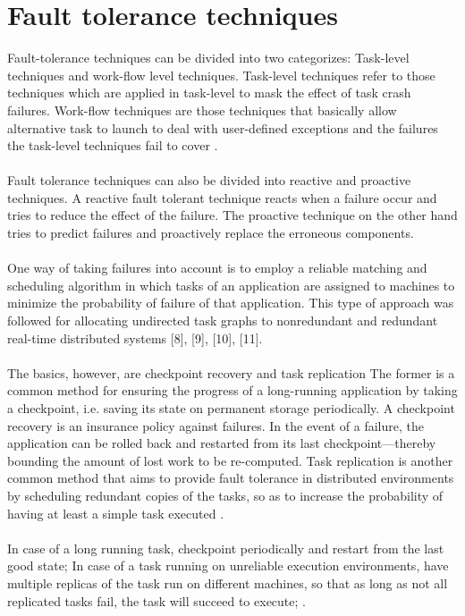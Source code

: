 \documentclass{cslthse-msc}
\begin{document}
\section{Fault tolerance techniques}
Fault-tolerance techniques can be divided into two categorizes:
Task-level techniques and work-flow level techniques.
Task-level techniques refer to those techniques which are applied in task-level to mask the effect of task crash failures. Work-flow techniques are those techniques that basically allow alternative task to launch to deal with user-defined exceptions and the failures the task-level techniques fail to cover \cite{gridWorkflow}.
\\\\
Fault tolerance techniques can also be divided into reactive and proactive techniques. A reactive fault tolerant technique reacts when a failure occur and tries to reduce the effect of the failure. The proactive technique on the other hand tries to predict failures and proactively replace the erroneous components.
\\\\
One way of taking failures into account is to employ a reliable matching and scheduling algorithm in which tasks of an application are assigned to machines to minimize the probability of failure of that application. This type of approach was followed for allocating undirected task graphs to nonredundant and redundant real-time distributed systems [8], [9], [10], [11].
\\\\
The basics, however, are checkpoint recovery and task replication The former is a common method for ensuring the progress of a long-running application by taking a checkpoint, i.e. saving its state on permanent storage periodically. A checkpoint recovery is an insurance policy against failures. In the event of a failure, the application can be rolled back and restarted from its last checkpoint—thereby bounding the amount of lost work to be re-computed. Task replication is another common method that aims to provide fault tolerance in distributed environments by scheduling redundant copies of the tasks, so as to increase the probability of having at least a simple task executed  \cite{effTaskReplMobGrid}. 
\\\\
In case of a long running task, checkpoint periodically and restart from the last good state;
In case of a task running on unreliable execution environments, have multiple replicas of the task run on different machines, so that as long as not all replicated tasks fail, the task will succeed to execute; \cite{gridWorkflow}.
\end{document}
